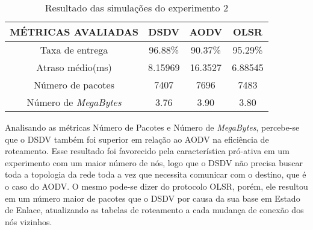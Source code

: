 \begin{table}[H]
	\centering
	\caption{Resultado das simula\c{c}\~oes do experimento 2}
	\begin{tabular}{ | c | c | c | c | }
		\hline
		M\'ETRICAS AVALIADAS & DSDV & AODV & OLSR \\ \hline
		Taxa de entrega & 96.88\% & 90.37\% & 95.29\%  \\ \hline
		Atraso m\'edio(ms) & 8.15969 & 16.3527 & 6.88545  \\ \hline
		N\'umero de pacotes & 7407 & 7696 & 7483  \\ \hline
		N\'umero de \textit{MegaBytes} & 3.76 & 3.90 & 3.80  \\ \hline
	\end{tabular}
	\label{tabExp2Result}
\end{table}

Analisando as m\'etricas N\'umero de Pacotes e N\'umero de \textit{MegaBytes}, percebe-se que o DSDV tamb\'em foi superior em rela\c{c}\~ao ao AODV na efici\^encia de roteamento.
Esse resultado foi favorecido pela caracter\'istica pr\'o-ativa em um experimento com um maior n\'umero de n\'os, logo que o DSDV n\~ao precisa buscar toda a topologia da rede toda a vez que necessita comunicar com o destino, que \'e o caso do AODV. 
O mesmo pode-se dizer do protocolo OLSR, por\'em, ele resultou em um n\'umero maior de pacotes que o DSDV por causa da sua base em Estado de Enlace, atualizando as tabelas de roteamento a cada mudan\c{c}a de conex\~ao dos n\'os vizinhos.


